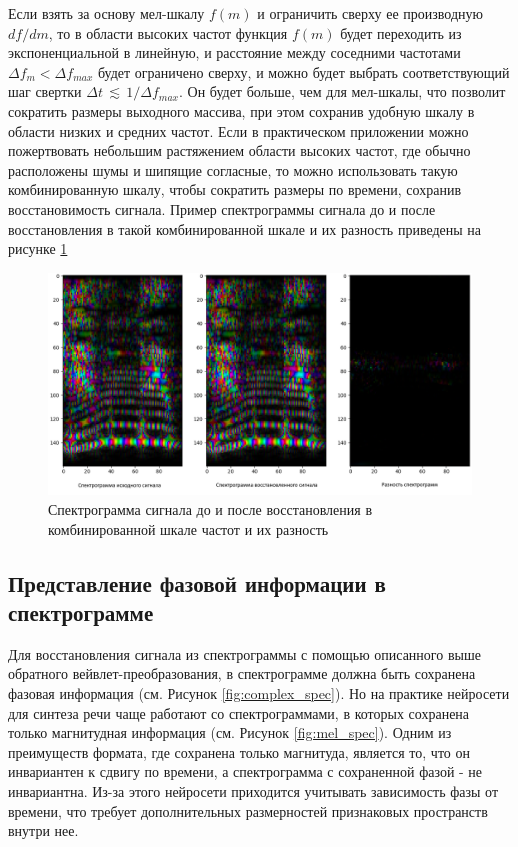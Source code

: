 Если взять за основу мел-шкалу $f(m)$ и ограничить сверху ее производную $df/dm$, 
то в области высоких частот функция $f(m)$ будет переходить из экспоненциальной в линейную, и 
расстояние между соседними частотами $\Delta f_m < \Delta f_{max}$ будет ограничено сверху, 
и можно будет выбрать соответствующий шаг свертки $\Delta t \, \lesssim \, 1 / \Delta f_{max}$. 
Он будет больше, чем для мел-шкалы, что позволит сократить размеры выходного массива, 
при этом сохранив удобную шкалу в области низких и средних частот. 
Если в практическом приложении можно пожертвовать небольшим растяжением области высоких частот, где обычно расположены шумы и шипящие согласные,
то можно использовать такую комбинированную шкалу, чтобы сократить размеры по времени, сохранив восстановимость сигнала.
Пример спектрограммы сигнала до и после восстановления в такой комбинированной шкале и их разность приведены на рисунке \ref{fig:spec_diff_combo_scale}

\begin{figure}
  \centering
  \includegraphics[width=0.8\linewidth]{figures/spec_diff_combo_scale}
  \caption{Спектрограмма сигнала до и после восстановления в комбинированной шкале частот и их разность}
  \label{fig:spec_diff_combo_scale}
\end{figure}


\subsection{Представление фазовой информации в спектрограмме}

Для восстановления сигнала из спектрограммы с помощью описанного выше обратного вейвлет-преобразования, 
в спектрограмме должна быть сохранена фазовая информация (см. Рисунок \ref{fig:complex_spec}). 
Но на практике нейросети для синтеза речи чаще работают со спектрограммами, 
в которых сохранена только магнитудная информация (см. Рисунок \ref{fig:mel_spec}).
Одним из преимуществ формата, где сохранена только магнитуда, является то, что он инвариантен к сдвигу по времени, 
а спектрограмма с сохраненной фазой - не инвариантна. 
Из-за этого нейросети приходится учитывать зависимость фазы от времени, 
что требует дополнительных размерностей признаковых пространств внутри нее.

